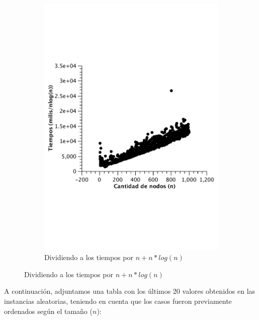 \begin{figure}[H]
        \begin{subfigure}[b]{0.25\textwidth}
                \includegraphics[width=\textwidth]{imagenes/vacio-matriz-4.pdf}
                \caption{Dividiendo a los tiempos por $n + n*log(n)$}
        \end{subfigure}

\end{figure}

A continuación, adjuntamos una tabla con los últimos 20 valores obtenidos en las instancias aleatorias, teniendo en cuenta que los casos fueron previamente ordenados según el tamaño ($n$):

